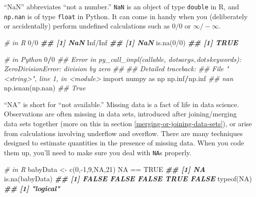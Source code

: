 \documentclass[
  12pt,
]{krantz}
\makeatletter
\newenvironment{Shaded}{\begin{snugshade}}{\end{snugshade}}
\newcommand{\CommentTok}[1]{\textcolor[rgb]{0.37,0.37,0.37}{\textit{#1}}}
\newcommand{\ConstantTok}[1]{\textcolor[rgb]{0,0,0}{#1}}
\newcommand{\DecValTok}[1]{\textcolor[rgb]{0.06,0.06,0.06}{#1}}
\newcommand{\DocumentationTok}[1]{\textcolor[rgb]{0.37,0.37,0.37}{\textbf{\textit{#1}}}}
\newcommand{\FunctionTok}[1]{\textcolor[rgb]{0,0,0}{#1}}
\newcommand{\ImportTok}[1]{#1}
\newcommand{\NormalTok}[1]{#1}
\newcommand{\OperatorTok}[1]{\textcolor[rgb]{0.43,0.43,0.43}{\textbf{#1}}}
\newcommand{\OtherTok}[1]{\textcolor[rgb]{0.37,0.37,0.37}{#1}}
\newcommand{\SpecialCharTok}[1]{\textcolor[rgb]{0,0,0}{#1}}
\newenvironment{kframe}{%
\medskip{}
\setlength{\fboxsep}{.8em}
 \def\at@end@of@kframe{}%
 \ifinner\ifhmode%
  \def\at@end@of@kframe{\end{minipage}}%
  \begin{minipage}{\columnwidth}%
 \fi\fi%
 \def\FrameCommand##1{\hskip\@totalleftmargin \hskip-\fboxsep
 \colorbox{shadecolor}{##1}\hskip-\fboxsep
     \hskip-\linewidth \hskip-\@totalleftmargin \hskip\columnwidth}%
 \MakeFramed {\advance\hsize-\width
   \@totalleftmargin\z@ \linewidth\hsize
   \@setminipage}}%
 {\par\unskip\endMakeFramed%
 \at@end@of@kframe}
\renewenvironment{Shaded}{\begin{kframe}}{\end{kframe}}
\makeatother
\begin{document}
``NaN'' abbreviates ``not a number.'' \texttt{NaN} is an object of type \texttt{double} in R, and \texttt{np.nan} is of type \texttt{float} in Python. It can come in handy when you (deliberately or accidentally) perform undefined calculations such as \(0/0\) or \(\infty / -\infty\).

\begin{Shaded}
\begin{Highlighting}[]
\CommentTok{\# in R}
\DecValTok{0}\SpecialCharTok{/}\DecValTok{0}
\DocumentationTok{\#\# [1] NaN}
\ConstantTok{Inf}\SpecialCharTok{/}\ConstantTok{Inf}
\DocumentationTok{\#\# [1] NaN}
\FunctionTok{is.na}\NormalTok{(}\DecValTok{0}\SpecialCharTok{/}\DecValTok{0}\NormalTok{)}
\DocumentationTok{\#\# [1] TRUE}
\end{Highlighting}
\end{Shaded}

\begin{Shaded}
\begin{Highlighting}[]
\CommentTok{\# in Python}
\DecValTok{0}\OperatorTok{/}\DecValTok{0}
\CommentTok{\#\# Error in py\_call\_impl(callable, dots$args, dots$keywords): ZeroDivisionError: division by zero}
\CommentTok{\#\# }
\CommentTok{\#\# Detailed traceback:}
\CommentTok{\#\#   File "\textless{}string\textgreater{}", line 1, in \textless{}module\textgreater{}}
\ImportTok{import}\NormalTok{ numpy }\ImportTok{as}\NormalTok{ np}
\NormalTok{np.inf}\OperatorTok{/}\NormalTok{np.inf}
\CommentTok{\#\# nan}
\NormalTok{np.isnan(np.nan)}
\CommentTok{\#\# True}
\end{Highlighting}
\end{Shaded}

``NA'' is short for ``not available.'' Missing data is a fact of life in data science. Observations are often missing in data sets, introduced after joining/merging data sets together (more on this in section \ref{merging-or-joining-data-sets}), or arise from calculations involving underflow and overflow. There are many techniques designed to estimate quantities in the presence of missing data. When you code them up, you'll need to make sure you deal with \texttt{NA}s properly.

\begin{Shaded}
\begin{Highlighting}[]
\CommentTok{\# in R}
\NormalTok{babyData }\OtherTok{\textless{}{-}} \FunctionTok{c}\NormalTok{(}\DecValTok{0}\NormalTok{,}\SpecialCharTok{{-}}\DecValTok{1}\NormalTok{,}\DecValTok{9}\NormalTok{,}\ConstantTok{NA}\NormalTok{,}\DecValTok{21}\NormalTok{)}
\ConstantTok{NA} \SpecialCharTok{==} \ConstantTok{TRUE} 
\DocumentationTok{\#\# [1] NA}
\FunctionTok{is.na}\NormalTok{(babyData)}
\DocumentationTok{\#\# [1] FALSE FALSE FALSE  TRUE FALSE}
\FunctionTok{typeof}\NormalTok{(}\ConstantTok{NA}\NormalTok{)}
\DocumentationTok{\#\# [1] "logical"}
\end{Highlighting}
\end{Shaded}
\end{document}
